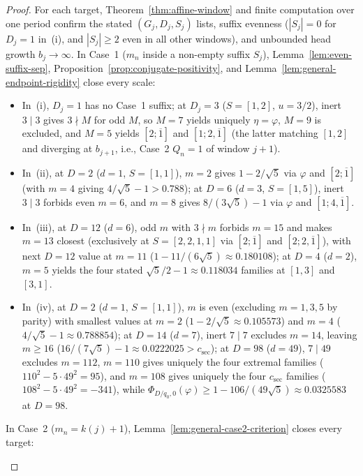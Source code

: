 \documentclass[11pt]{amsart}
\theoremstyle{definition}
\theoremstyle{remark}
\numberwithin{equation}{section}
\begin{document}
\begin{proof}
For each target, Theorem~\ref{thm:affine-window} and finite computation over one
period confirm the stated $(G_j,D_j,S_j)$ lists, suffix evenness ($|S_j|=0$
for $D_j=1$ in~(i), and $|S_j|\ge2$ even in all other windows), and unbounded
head growth $b_j\to\infty$. In Case~1 ($m_n$ inside a non-empty suffix $S_j$),
Lemma~\ref{lem:even-suffix-sep}, Proposition~\ref{prop:conjugate-positivity},
and Lemma~\ref{lem:general-endpoint-rigidity} close every scale:
\begin{itemize}
\item In~(i), $D_j=1$ has no Case~1 suffix; at $D_j=3$ ($S=[1,2]$, $u=3/2$),
      inert $3\mid3$ gives $3\nmid M$ for odd $M$, so $M=7$ yields uniquely
      $\eta=\varphi$, $M=9$ is excluded, and $M=5$ yields $[2;\overline1]$ and
      $[1;2,\overline1]$ (the latter matching $[1,2]$ and diverging at $b_{j+1}$,
      i.e., Case~2 $Q_n=1$ of window $j+1$).
\item In~(ii), at $D=2$ ($d=1$, $S=[1,1]$), $m=2$ gives $1-2/\sqrt5$ via
      $\varphi$ and $[2;\overline1]$ (with $m=4$ giving $4/\sqrt5-1>0.788$);
      at $D=6$ ($d=3$, $S=[1,5]$), inert $3\mid3$ forbids even $m=6$, and
      $m=8$ gives $8/(3\sqrt5)-1$ via $\varphi$ and $[1;4,\overline1]$.
\item In~(iii), at $D=12$ ($d=6$), odd $m$ with $3\nmid m$ forbids $m=15$ and
      makes $m=13$ closest (exclusively at $S=[2,2,1,1]$ via $[2;\overline1]$
      and $[2;2,\overline1]$), with next $D=12$ value at $m=11$
      ($1-11/(6\sqrt5)\approx0.180108$); at $D=4$ ($d=2$), $m=5$ yields the
      four stated $\sqrt5/2-1\approx0.118034$ families at $[1,3]$ and $[3,1]$.
\item In~(iv), at $D=2$ ($d=1$, $S=[1,1]$), $m$ is even (excluding $m=1,3,5$
      by parity) with smallest values at $m=2$ ($1-2/\sqrt5\approx0.105573$)
      and $m=4$ ($4/\sqrt5-1\approx0.788854$); at $D=14$ ($d=7$), inert $7\mid7$
      excludes $m=14$, leaving $m\ge16$ ($16/(7\sqrt5)-1\approx0.0222025>c_{\mathrm{sec}}$);
      at $D=98$ ($d=49$), $7\mid49$ excludes $m=112$, $m=110$ gives uniquely
      the four extremal families ($110^2-5\cdot49^2=95$), and $m=108$ gives
      uniquely the four $c_{\mathrm{sec}}$ families ($108^2-5\cdot49^2=-341$),
      while $\Phi_{D/q_0,0}(\varphi)\ge1-106/(49\sqrt5)\approx0.0325583$ at
      $D=98$.
\end{itemize}
In Case~2 ($m_n=k(j)+1$), Lemma~\ref{lem:general-case2-criterion} closes every
target:
\begin{itemize}

\end{itemize}
\end{proof}
\end{document}
